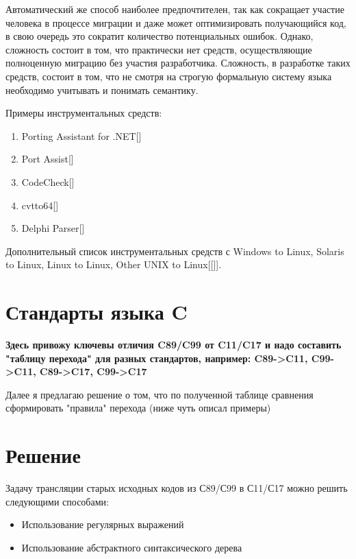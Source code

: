 \documentclass{article}
\begin{document}
	Автоматический же способ наиболее предпочтителен, так как сокращает участие человека в процессе миграции и даже может оптимизировать получающийся код, в свою очередь это сократит количество потенциальных ошибок. Однако, сложность состоит в том, что практически нет средств, осуществляющие полноценную миграцию без участия разработчика. Сложность, в разработке таких средств, состоит в том, что не смотря на строгую формальную систему языка необходимо учитывать и понимать семантику.

	Примеры инструментальных средств:
	
	\begin{enumerate}
		\item{Porting Assistant for .NET[\theexample]}
		\item{Port Assist[\theexample]}
		\item{CodeCheck[\theexample]}
		\item{cvtto64[\theexample]}
		\item{Delphi Parser[\theexample]}
	\end{enumerate}

	Дополнительный список инструментальных средств с Windows to Linux, Solaris to Linux, Linux to Linux, Other UNIX to Linux[[\theexample]].

	\section{Стандарты языка C}

	\textbf{Здесь привожу ключевы отличия C89/C99 от C11/C17 и надо составить "таблицу перехода" для разных стандартов, например: C89->C11, C99->C11, C89->C17, C99->C17}

	Далее я предлагаю решение о том, что по полученной таблице сравнения сформировать "правила" перехода (ниже чуть описал примеры)



	\section{Решение}

	Задачу трансляции старых исходных кодов из С89/С99 в С11/С17 можно решить следующими способами:

	\begin{itemize}
		\item{Использование регулярных выражений}
		\item{Использование абстрактного синтаксического дерева}
	\end{itemize}
\end{document}
